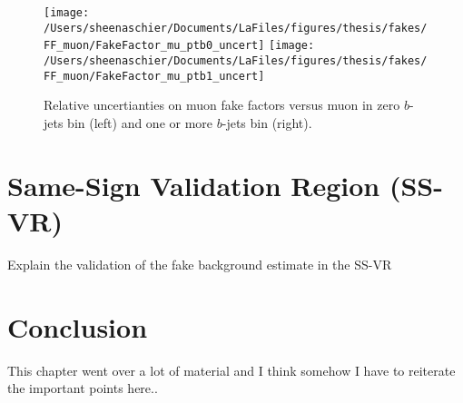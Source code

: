 \begin{figure}[tbp]
  \centering
  \texttt{[image: /Users/sheenaschier/Documents/LaFiles/figures/thesis/fakes/FF\_muon/FakeFactor\_mu\_ptb0\_uncert]}
  \texttt{[image: /Users/sheenaschier/Documents/LaFiles/figures/thesis/fakes/FF\_muon/FakeFactor\_mu\_ptb1\_uncert]}\\
  \caption{Relative uncertianties on muon fake factors versus muon \pt{} in zero $b$-jets bin (left) and one or more $b$-jets bin (right).}
  \label{fig:muon_FF_rel_uncert}
\end{figure}

 \FloatBarrier

\section{Same-Sign Validation Region (SS-VR)}
\label{sec:ssvr}
Explain the validation of the fake background estimate in the SS-VR
 
 \section{Conclusion}
 \label{sec:FFcon}
 This chapter went over a lot of material and I think somehow I have to reiterate the important points here..
